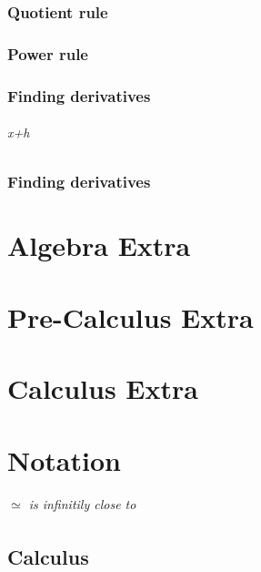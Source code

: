 \documentclass[12pt, a4paper,oneside]{book}
\begin{document}
\section{Quotient rule}




\section{Power rule}


\section{Finding derivatives}
\paragraph{x+h}

\section{Finding derivatives}


\part {Algebra Extra}

\part {Pre-Calculus Extra}

\part{Calculus Extra}

\appendix 
\part{Notation}
\paragraph{\(\simeq\) is infinitily close to }
\chapter{Calculus}
\end{document}
